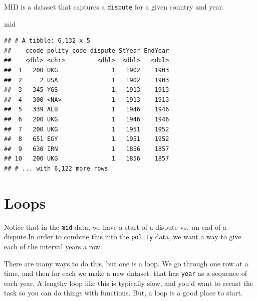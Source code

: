 \documentclass[
]{book}
\newenvironment{Shaded}{\begin{snugshade}}{\end{snugshade}}
\newcommand{\NormalTok}[1]{#1}
\theoremstyle{definition}
\theoremstyle{definition}
\theoremstyle{definition}
\theoremstyle{remark}
\begin{document}
MID is a dataset that captures a \texttt{dispute} for a given country and year.

\begin{Shaded}
\begin{Highlighting}[]
\NormalTok{mid}
\end{Highlighting}
\end{Shaded}

\begin{verbatim}
## # A tibble: 6,132 x 5
##    ccode polity_code dispute StYear EndYear
##    <dbl> <chr>         <dbl>  <dbl>   <dbl>
##  1   200 UKG               1   1902    1903
##  2     2 USA               1   1902    1903
##  3   345 YGS               1   1913    1913
##  4   300 <NA>              1   1913    1913
##  5   339 ALB               1   1946    1946
##  6   200 UKG               1   1946    1946
##  7   200 UKG               1   1951    1952
##  8   651 EGY               1   1951    1952
##  9   630 IRN               1   1856    1857
## 10   200 UKG               1   1856    1857
## # ... with 6,122 more rows
\end{verbatim}

\hypertarget{loops}{%
\section{Loops}\label{loops}}

Notice that in the \texttt{mid} data, we have a start of a dispute vs.~an end of a dispute.In order to combine this into the \texttt{polity} data, we want a way to give each of the interval years a row.

There are many ways to do this, but one is a loop. We go through one row at a time, and then for each we make a new dataset. that has \texttt{year} as a sequence of each year. A lengthy loop like this is typically slow, and you'd want to recast the task so you can do things with functions. But, a loop is a good place to start.
\end{document}
